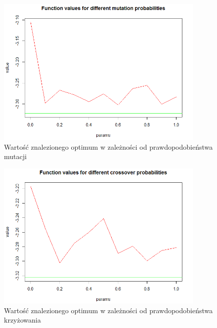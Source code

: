 \documentclass[11pt, a4paper]{article}
\begin{document}
\begin{figure}[H]
	\begin{center}
		\includegraphics[width=0.9\textwidth]{./assets/Hartman62.png} %
		\caption{Wartość znalezionego optimum w zależności od prawdopodobieństwa mutacji}
		\label{fig:hartman62}
	\end{center}
\end{figure}

\begin{figure}[H]
	\begin{center}
		\includegraphics[width=0.9\textwidth]{./assets/Hartman63.png} %
		\caption{Wartość znalezionego optimum w zależności od prawdopodobieństwa krzyżowania}
		\label{fig:hartman63}
	\end{center}
\end{figure}
\end{document}
